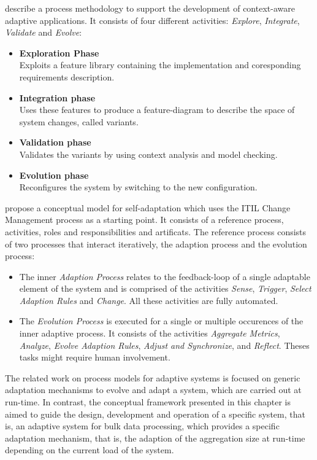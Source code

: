 \cite{Inverardi:2010ki} describe a process methodology to support the development of context-aware adaptive applications. It consists of four different activities: \emph{Explore}, \emph{Integrate}, \emph{Validate} and \emph{Evolve}:
\begin{itemize}
	\item \textbf{Exploration Phase}\\
	Exploits a feature library containing the implementation and coresponding requirements description.
	\item \textbf{Integration phase}\\
	Uses these features to produce a feature-diagram to describe the space of system changes, called variants.
	\item \textbf{Validation phase}\\
	Validates the variants by using context analysis and model checking.
	\item \textbf{Evolution phase}\\
	Reconfigures the system by switching to the new configuration.
\end{itemize}

\cite{Gacek:2008ei} propose a conceptual model for self-adaptation which uses the ITIL Change Management process as a starting point. It consists of a reference process, activities, roles and responsibilities and artificats. The reference process consists of two processes that interact iteratively, the adaption process and the evolution process:
\begin{itemize}
	\item The inner \emph{Adaption Process} relates to the feedback-loop of a single adaptable element of the system and is comprised of the activities \emph{Sense}, \emph{Trigger}, \emph{Select Adaption Rules} and \emph{Change}. All these activities are fully automated.
	\item The \emph{Evolution Process} is executed for a single or multiple occurences of the inner adaptive process. It consists of the activities \emph{Aggregate Metrics}, \emph{Analyze}, \emph{Evolve Adaption Rules}, \emph{Adjust and Synchronize}, and \emph{Reflect}. Theses tasks might require human involvement.
\end{itemize}

The related work on process models for adaptive systems is focused on generic adaptation mechanisms to evolve and adapt a system, which are carried out at run-time. In contrast, the conceptual framework presented in this chapter is aimed to guide the design, development and operation of a specific system, that is, an adaptive system for bulk data processing, which provides a specific adaptation mechanism, that is, the adaption of the aggregation size at run-time depending on the current load of the system. 


